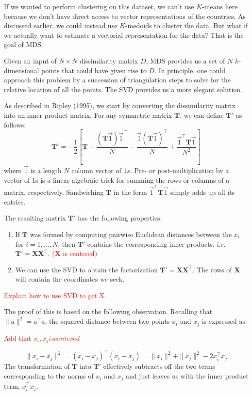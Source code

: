 \documentclass[a4paper]{article}
\begin{document}
If we wanted to perform clustering on this dataset, we can't use $K$-means here because we don't have direct access to vector representations of the countries.  As discussed earlier, we could instead use $K$-medoids to cluster the data.  But what if we actually want to estimate a vectorial representation for the data?  That is the goal of MDS.

Given an input of $N \times N$ dissimilarity matrix $D$, MDS provides us a set of $N$ $k$-dimensional points that could have given rise to $D$.  In principle, one could approach this problem by a succession of triangulation steps to solve for the relative location of all the points.  The SVD provides us a more elegant solution.

As described in Ripley (1995), we start by converting the dissimilarity matrix into an inner product matrix.  For any symmetric matrix $\mathbf{T}$, we can define $\mathbf{T}'$ as follows:
$$
\mathbf{T}' = -\frac{1}{2} \left[\mathbf{T}-\frac{(\mathbf{T}\vec{1})\vec{1}^\top}{N}-\frac{\vec{1}(\mathbf{T}\vec{1})^\top}{N}+\frac{\vec{1}^\top\mathbf{T}\vec{1}}{N^2}\right]
$$
where $\vec{1}$ is a length $N$ column vector of $1s$.  Pre- or post-multiplication by a vector of 1s is a linear algebraic trick for summing the rows or columns of a matrix, respectively.  Sandwiching $\mathbf{T}$ in the form $\vec{1}^\top\mathbf{T}\vec{1}$ simply adds up all its entries.

The resulting matrix $\mathbf{T}'$ has the following properties:
\begin{enumerate}
\item If $\mathbf{T}$ was formed by computing pairwise Euclidean distances between the $x_i$ for $i=1,\ldots,N$, then $\mathbf{T}'$ contains the corresponding inner products, i.e. $\mathbf{T}' = \mathbf{XX}^\top$. \textcolor{red}{(\textbf{X} is centered)}
\item We can use the SVD to obtain the factorization $\mathbf{T}'=\mathbf{XX}^\top$. The rows of $\mathbf{X}$ will contain the coordinates we seek.
\end{enumerate}
\textcolor{red}{Explain how to use SVD to get X.}

The proof of this is based on the following observation.  Recalling that $\|a\|^2 = a^\top a$, the squared distance between two points $x_i$ and $x_j$ is expressed as

\textcolor{red}{Add that $x_i, x_j is centered$}

$$
\|x_i-x_j\|^2 = (x_i-x_j)^\top(x_i-x_j) = \|x_i\|^2 + \|x_j\|^2 - 2x_i^\top x_j
$$
The transformation of $\mathbf{T}$ into $\mathbf{T}'$ effectively subtracts off the two terms corresponding to the norms of $x_i$ and $x_j$ and just leaves us with the inner product term, $x_i^\top x_j$.
\end{document}
